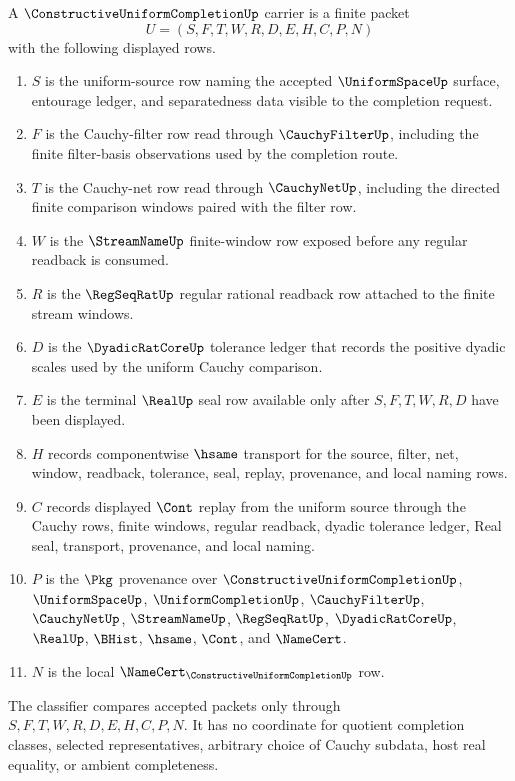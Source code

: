 \begin{definition}
\label{def:constructive-uniform-completion-carrier}
A $\ConstructiveUniformCompletionUp$ carrier is a finite packet
$$
U=(S,F,T,W,R,D,E,H,C,P,N)
$$
with the following displayed rows.
\begin{enumerate}
\item $S$ is the uniform-source row naming the accepted $\UniformSpaceUp$ surface, entourage ledger, and separatedness data visible to the completion request.
\item $F$ is the Cauchy-filter row read through $\CauchyFilterUp$, including the finite filter-basis observations used by the completion route.
\item $T$ is the Cauchy-net row read through $\CauchyNetUp$, including the directed finite comparison windows paired with the filter row.
\item $W$ is the $\StreamNameUp$ finite-window row exposed before any regular readback is consumed.
\item $R$ is the $\RegSeqRatUp$ regular rational readback row attached to the finite stream windows.
\item $D$ is the $\DyadicRatCoreUp$ tolerance ledger that records the positive dyadic scales used by the uniform Cauchy comparison.
\item $E$ is the terminal $\RealUp$ seal row available only after $S,F,T,W,R,D$ have been displayed.
\item $H$ records componentwise $\hsame$ transport for the source, filter, net, window, readback, tolerance, seal, replay, provenance, and local naming rows.
\item $C$ records displayed $\Cont$ replay from the uniform source through the Cauchy rows, finite windows, regular readback, dyadic tolerance ledger, Real seal, transport, provenance, and local naming.
\item $P$ is the $\Pkg$ provenance over $\ConstructiveUniformCompletionUp$, $\UniformSpaceUp$, $\UniformCompletionUp$, $\CauchyFilterUp$, $\CauchyNetUp$, $\StreamNameUp$, $\RegSeqRatUp$, $\DyadicRatCoreUp$, $\RealUp$, $\BHist$, $\hsame$, $\Cont$, and $\NameCert$.
\item $N$ is the local $\NameCert_{\ConstructiveUniformCompletionUp}$ row.
\end{enumerate}
The classifier compares accepted packets only through $S,F,T,W,R,D,E,H,C,P,N$. It has no coordinate for quotient completion classes, selected representatives, arbitrary choice of Cauchy subdata, host real equality, or ambient completeness.
\end{definition}

